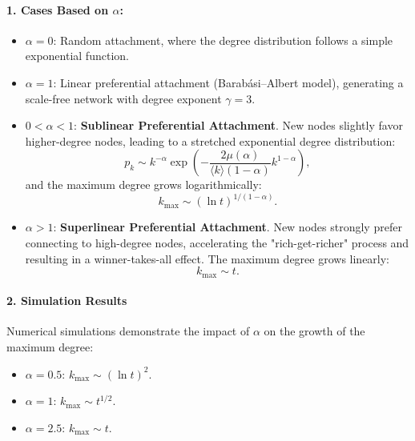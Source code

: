 \documentclass{article}
\begin{document}
\paragraph{1. Cases Based on \( \alpha \):}
\begin{itemize}
    \item \( \alpha = 0 \): Random attachment, where the degree distribution follows a simple exponential function.
    \item \( \alpha = 1 \): Linear preferential attachment (Barabási–Albert model), generating a scale-free network with degree exponent \( \gamma = 3 \).
    \item \( 0 < \alpha < 1 \): \textbf{Sublinear Preferential Attachment}. New nodes slightly favor higher-degree nodes, leading to a stretched exponential degree distribution:
    \[
    p_k \sim k^{-\alpha} \exp\left(-\frac{2\mu(\alpha)}{\langle k \rangle (1-\alpha)} k^{1-\alpha}\right),
    \]
    and the maximum degree grows logarithmically:
    \[
    k_{\text{max}} \sim (\ln t)^{1/(1-\alpha)}.
    \]
    \item \( \alpha > 1 \): \textbf{Superlinear Preferential Attachment}. New nodes strongly prefer connecting to high-degree nodes, accelerating the "rich-get-richer" process and resulting in a winner-takes-all effect. The maximum degree grows linearly:
    \[
    k_{\text{max}} \sim t.
    \]
\end{itemize}

\paragraph{2. Simulation Results}
Numerical simulations demonstrate the impact of \( \alpha \) on the growth of the maximum degree:
\begin{itemize}
    \item \( \alpha = 0.5 \): \( k_{\text{max}} \sim (\ln t)^2 \).
    \item \( \alpha = 1 \): \( k_{\text{max}} \sim t^{1/2} \).
    \item \( \alpha = 2.5 \): \( k_{\text{max}} \sim t \).
\end{itemize}
\end{document}

